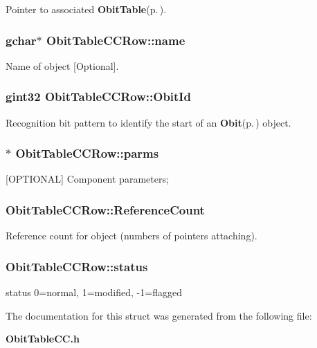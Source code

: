 Pointer to associated {\bf Obit\-Table}{\rm (p.\,\pageref{structObitTable})}. 

\subsubsection{\setlength{\rightskip}{0pt plus 5cm}gchar$\ast$ {\bf Obit\-Table\-CCRow::name}}\label{structObitTableCCRow_o3}


Name of object [Optional]. 

\subsubsection{\setlength{\rightskip}{0pt plus 5cm}gint32 {\bf Obit\-Table\-CCRow::Obit\-Id}}\label{structObitTableCCRow_o0}


Recognition bit pattern to identify the start of an {\bf Obit}{\rm (p.\,\pageref{structObit})} object. 

\subsubsection{$\ast$ {\bf Obit\-Table\-CCRow::parms}}\label{structObitTableCCRow_o9}


[OPTIONAL] Component parameters; 

\subsubsection{ {\bf Obit\-Table\-CCRow::Reference\-Count}}\label{structObitTableCCRow_o2}


Reference count for object (numbers of pointers attaching). 

\subsubsection{ {\bf Obit\-Table\-CCRow::status}}\label{structObitTableCCRow_o10}


status 0=normal, 1=modified, -1=flagged 



The documentation for this struct was generated from the following file:\begin{CompactItemize}
\item 
{\bf Obit\-Table\-CC.h}\end{CompactItemize}
